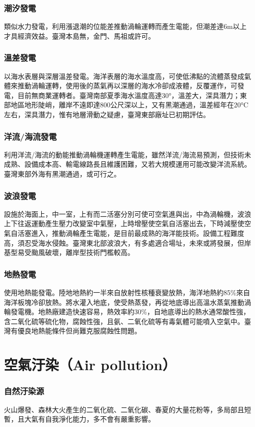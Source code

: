 \documentclass[a4paper,12pt]{report}
\begin{document}
\subsubsection{潮汐發電}
類似水力發電，利用漲退潮的位能差推動渦輪運轉而產生電能，但潮差達6m以上才具經濟效益。臺灣本島無，金門、馬祖或許可。
\subsubsection{溫差發電}
以海水表層與深層溫差發電。海洋表層的海水溫度高，可使低沸點的流體蒸發成氣體來推動渦輪運轉，使用後的蒸氣再以深層的海水冷卻成液體，反覆運作，可發電，目前無商業運轉者。臺灣南部夏季海水溫度高達30°，溫差大，深具潛力；東部地區地形陡峭，離岸不遠即達800公尺深以上，又有黑潮通過，溫差經年在20°C左右，深具潛力，惟有地層滑動之疑慮，臺灣東部廠址已初期評估。
\subsubsection{洋流/海流發電}
利用洋流/海流的動能推動渦輪機運轉產生電能，雖然洋流/海流易預測，但技術未成熟、設備成本高、輸電線路長且維護困難，又若大規模運用可能改變洋流系統。臺灣東部外海有黑潮通過，或可行之。
\subsubsection{波浪發電}
設施於海面上，中一室，上有而二活塞分別可使可空氣進與出，中為渦輪機，波浪上下往返運動產生壓力改變室中氣壓，上時增壓使空氣自活塞出去，下時減壓使空氣自活塞進入，推動渦輪產生電能，是目前最成熟的海洋能技術。設備工程難度高，須忍受海水侵蝕。臺灣東北部波浪大，有多處適合場址，未來或將發展，但岸基型易受颱風破壞，離岸型技術門檻較高。
\subsubsection{地熱發電}
使用地熱能發電。陸地地熱約一半來自放射性核種衰變放熱，海洋地熱約85\%來自海洋板塊冷卻放熱。將水灌入地底，使受熱蒸發，再從地底導出高溫水蒸氣推動渦輪發電機。地熱廠建造快速容易，熱效率約30\%，自地底導出的熱水通常酸性強，含二氧化硫等硫化物，腐蝕性強，且氨、二氧化硫等有毒氣體可能噴入空氣中。臺灣有優良地熱能條件但尚難克服腐蝕性問題。


\section{空氣汙染（Air pollution）}
\subsubsection{自然汙染源}
火山爆發、森林大火產生的二氧化硫、二氧化碳、春夏的大量花粉等，多局部且短暫，且大氣有自我淨化能力，多不會有嚴重影響。
\end{document}
